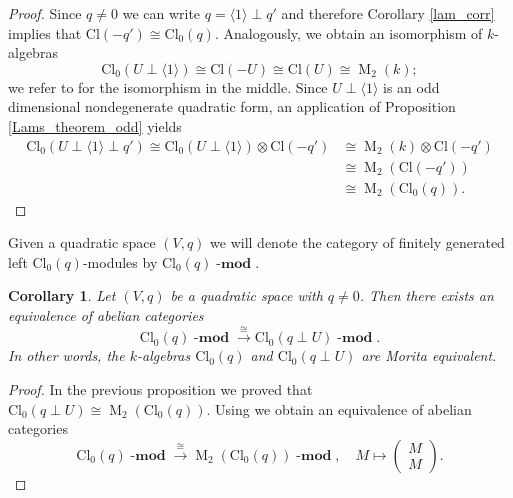 \documentclass[a4paper, twoside, 11pt]{amsart}
\newtheorem{corollary}{Corollary}[theorem]
\theoremstyle{definition}
\theoremstyle{remark}
\numberwithin{equation}{theorem}
\DeclareMathOperator{\matri}{M}
\newcommand{\lmod}{{\operatorname{\mathbf{-mod}}}}
\newcommand{\evencl}{\mathrm{Cl}_0}
\newcommand{\cl}{\mathrm{Cl}}
\begin{document}
\begin{proof}
    Since $q\neq 0$ we can write $q = \langle 1 \rangle \perp q'$ and therefore Corollary \ref{lam_corr} implies that $\cl(-q') \cong \evencl(q)$. Analogously, we obtain an isomorphism of $k$-algebras 
    \begin{equation*}
        \evencl( U \perp \langle 1 \rangle) \cong \cl(-U) \cong \cl(U) \cong \matri_2(k);
    \end{equation*}
    we refer to \cite[Proposition 2.12]{Lam_quadratic} for the isomorphism in the middle. Since $U \perp \langle 1\rangle$ is an odd dimensional nondegenerate quadratic form, an application of Proposition \ref{Lams_theorem_odd} yields 
    \begin{equation*}
        \begin{aligned}
            \evencl( U \perp \langle 1 \rangle \perp q') \cong \evencl( U \perp \langle 1 \rangle) \otimes \cl(-q') &\cong \matri_2(k)  \otimes \cl(-q') \\
            &\cong \matri_2(\cl(-q')) \\
            &\cong \matri_2(\evencl(q)).
        \end{aligned}
    \end{equation*}
\end{proof}
Given a quadratic space $(V,q)$ we will denote the category of finitely generated left $\evencl(q)$-modules by $\evencl(q) \lmod$. 
\begin{corollary}\label{morita}
    Let $(V,q)$ be a quadratic space with $q\neq 0$. Then there exists an equivalence of abelian categories 
    \begin{equation}\label{morita_equiv}
        \evencl(q) \lmod \overset{\cong}{\longrightarrow} \evencl(q \perp U)\lmod.
    \end{equation}
    In other words, the $k$-algebras $\evencl(q)$ and $\evencl(q \perp U)$ are Morita equivalent.
\end{corollary}
\begin{proof}
    In the previous proposition we proved that $\evencl(q \perp U) \cong \matri_2(\evencl(q))$. Using \cite[Corollary 5.56]{rotman_hom_alg} we obtain an equivalence of abelian categories 
    \begin{equation*}
        \evencl(q) \lmod \overset{\cong}{\longrightarrow} \matri_2(\evencl(q)) \lmod, \quad M \mapsto \begin{pmatrix}M\\M\end{pmatrix}.
    \end{equation*}
\end{proof}
\end{document}
